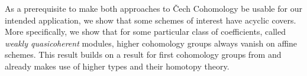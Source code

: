 \documentclass[letterpaper]{../util/easychair}
\begin{document}
As a prerequisite to make both approaches to \v{C}ech Cohomology be usable for our intended application,
we show that some schemes of interest have acyclic covers.
More specifically, we show that for some particular class of coefficients, called \emph{weakly quasicoherent} modules,
higher cohomology groups always vanish on affine schemes.
This result builds on a result for first cohomology groups from \cite{draft}
and already makes use of higher types and their homotopy theory.

\printbibliography
\end{document}
